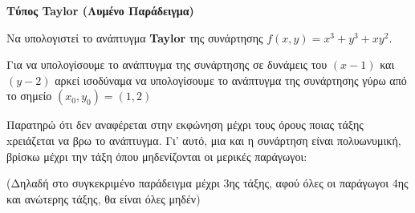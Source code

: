 


\pagestyle{askhseis}

\everymath{\displaystyle}




\begin{center}
  \large\bfseries \textcolor{Col1}{Τύπος Taylor (Λυμένο Παράδειγμα)}
\end{center}

\vspace{\baselineskip}

\begin{example}
  Να υπολογιστεί το ανάπτυγμα \textbf{Taylor} της συνάρτησης 
  $ f(x,y) = x^{3} + y^{3} + xy^{2} $. 
\end{example}

Για να υπολογίσουμε το ανάπτυγμα της συνάρτησης σε δυνάμεις του $(x-1)$ και $(y-2)$ 
αρκεί ισοδύναμα να υπολογίσουμε το ανάπτυγμα της συνάρτησης γύρω από το 
σημείο $(x_0,y_0)=(1,2)$

Παρατηρώ ότι δεν αναφέρεται στην εκφώνηση μέχρι τους όρους ποιας τάξης 
xρειάζεται να βρω το ανάπτυγμα.  Γι' αυτό, μια και η συνάρτηση είναι πολυωνυμική,
βρίσκω μέχρι την τάξη όπου μηδενίζονται οι μερικές παράγωγοι: 

(Δηλαδή στο συγκεκριμένο παράδειγμα μέχρι $3$ης τάξης, αφού όλες οι παράγωγοι 
$4$ης και ανώτερης τάξης, θα είναι όλες μηδέν)

\vspace{\baselineskip}


\vspace{\baselineskip}

